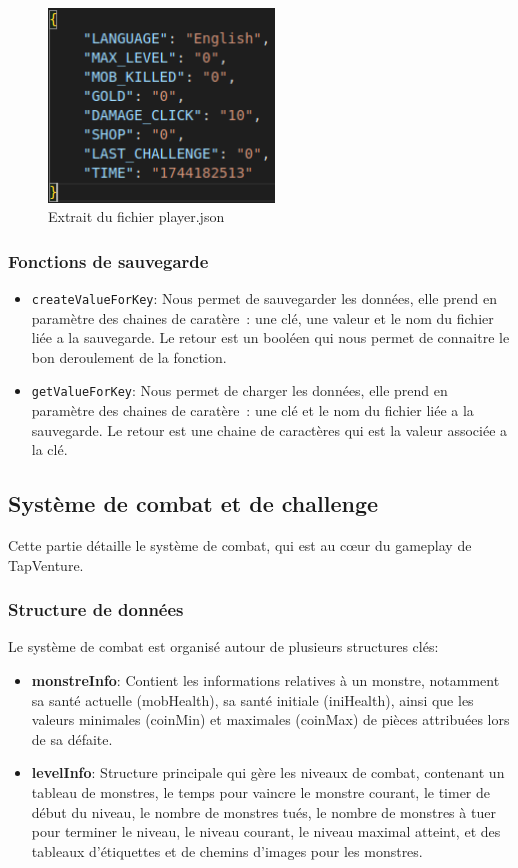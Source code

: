 \documentclass[11pt,a4paper]{article}
\begin{document}
\begin{figure}[h] 
    \centering 
    \includegraphics[width=6cm]{img/save_player.png} 
    \caption{Extrait du fichier player.json}
\end{figure}

\subsubsection{Fonctions de sauvegarde}
\begin{itemize}
    \item \texttt{createValueForKey}: Nous permet de sauvegarder les données, elle prend en paramètre des chaines de caratère~: une clé, une valeur et 
    le nom du fichier liée a la sauvegarde. Le retour est un booléen qui nous permet de connaitre le bon deroulement de la fonction.
    \item \texttt{getValueForKey}: Nous permet de charger les données, elle prend en paramètre des chaines de caratère~: une clé et le nom du fichier 
    liée a la sauvegarde. Le retour est une chaine de caractères qui est la valeur associée a la clé.
\end{itemize}

\subsection{Système de combat et de challenge}
Cette partie détaille le système de combat, qui est au cœur du gameplay de TapVenture.

\subsubsection{Structure de données}
Le système de combat est organisé autour de plusieurs structures clés:
\begin{itemize}
    \item \textbf{monstreInfo}: Contient les informations relatives à un monstre, notamment sa santé actuelle (mobHealth), sa santé initiale (iniHealth), ainsi que les valeurs minimales (coinMin) et maximales (coinMax) de pièces attribuées lors de sa défaite.
    \item \textbf{levelInfo}: Structure principale qui gère les niveaux de combat, contenant un tableau de monstres, le temps pour vaincre le monstre courant, le timer de début du niveau, le nombre de monstres tués, le nombre de monstres à tuer pour terminer le niveau, le niveau courant, le niveau maximal atteint, et des tableaux d'étiquettes et de chemins d'images pour les monstres.
\end{itemize}
\end{document}
